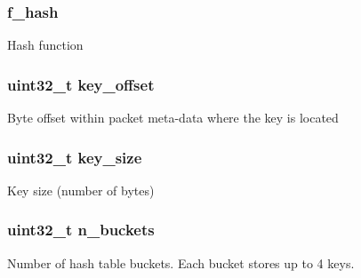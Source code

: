 \subsubsection[{f\+\_\+hash}]{ f\+\_\+hash}\label{structrte__table__hash__lru__params_a5a7373267cebe4384507b331c883624a}
Hash function \hypertarget{structrte__table__hash__lru__params_aa09132fc271bc1be2e4032587665bcf7}{}
\subsubsection[{key\+\_\+offset}]{\setlength{\rightskip}{0pt plus 5cm}uint32\+\_\+t key\+\_\+offset}\label{structrte__table__hash__lru__params_aa09132fc271bc1be2e4032587665bcf7}
Byte offset within packet meta-\/data where the key is located \hypertarget{structrte__table__hash__lru__params_a83844a351f4b92ad62ba71b38733aa04}{}
\subsubsection[{key\+\_\+size}]{\setlength{\rightskip}{0pt plus 5cm}uint32\+\_\+t key\+\_\+size}\label{structrte__table__hash__lru__params_a83844a351f4b92ad62ba71b38733aa04}
Key size (number of bytes) \hypertarget{structrte__table__hash__lru__params_a241ccfe90f415a07cad8a881fc0f83ac}{}
\subsubsection[{n\+\_\+buckets}]{\setlength{\rightskip}{0pt plus 5cm}uint32\+\_\+t n\+\_\+buckets}\label{structrte__table__hash__lru__params_a241ccfe90f415a07cad8a881fc0f83ac}
Number of hash table buckets. Each bucket stores up to 4 keys. \hypertarget{structrte__table__hash__lru__params_a4c48340399424293c79db3dc411e8231}{}
